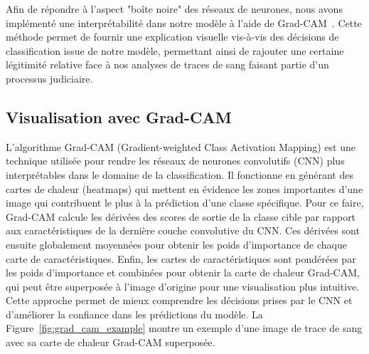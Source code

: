Afin de répondre à l'aspect "boîte noire" des réseaux de neurones, nous avons implémenté une interprétabilité dans notre modèle à l'aide de Grad-CAM~\cite{GRADCAM}. Cette méthode permet de fournir une explication visuelle vis-à-vis des décisions de classification issue de notre modèle, permettant ainsi de rajouter une certaine légitimité relative face à nos analyses de traces de sang faisant partie d'un processus judiciaire. 

\subsection{Visualisation avec Grad-CAM}
L'algorithme Grad-CAM (Gradient-weighted Class Activation Mapping) est une technique utilisée pour rendre les réseaux de neurones convolutifs (CNN) plus interprétables dans le domaine de la classification.
Il fonctionne en générant des cartes de chaleur (heatmaps) qui mettent en évidence les zones importantes d'une image qui contribuent le plus à la prédiction d'une classe spécifique.
Pour ce faire, Grad-CAM calcule les dérivées des scores de sortie de la classe cible par rapport aux caractéristiques de la dernière couche convolutive du CNN.
Ces dérivées sont ensuite globalement moyennées pour obtenir les poids d'importance de chaque carte de caractéristiques.
Enfin, les cartes de caractéristiques sont pondérées par les poids d'importance et combinées pour obtenir la carte de chaleur Grad-CAM, qui peut être superposée à l'image d'origine pour une visualisation plus intuitive.
Cette approche permet de mieux comprendre les décisions prises par le CNN et d'améliorer la confiance dans les prédictions du modèle.
La Figure~\ref{fig:grad_cam_example} montre un exemple d'une image de trace de sang avec sa carte de chaleur Grad-CAM superposée.

